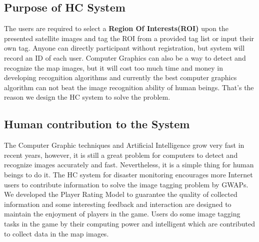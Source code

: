   \subsection{Purpose of HC System}
  The users are required to select a \textbf{Region Of Interests(ROI)} upon the presented satellite images 
  and tag the ROI from a provided tag list or input their own tag. Anyone can directly participant 
  without registration, but system will record an ID of each user.
  Computer Graphics can also be a way to detect and recognize the map images, but it will cost 
  too much time and money in developing recognition algorithms and currently the best 
  computer graphics algorithm can not beat the image recognition ability of human beings. 
  That's the reason we design the HC system to solve the problem.

  \subsection{Human contribution to the System}
  The Computer Graphic techniques and Artificial Intelligence grow very fast in recent years, 
  however, it is still a great problem for computers to detect and recognize images accurately and fast.
  Nevertheless, it is a simple thing for human beings to do it.
  The HC system for disaster monitoring encourages more Internet users to contribute information 
  to solve the image tagging problem by GWAPs. 
  We developed the Player Rating Model to guarantee the quality of collected information 
  and some interesting feedback and interaction are designed to maintain the enjoyment of players in the game.
  Users do some image tagging tasks in the game by their computing power and intelligent 
  which are contributed to collect data in the map images.

